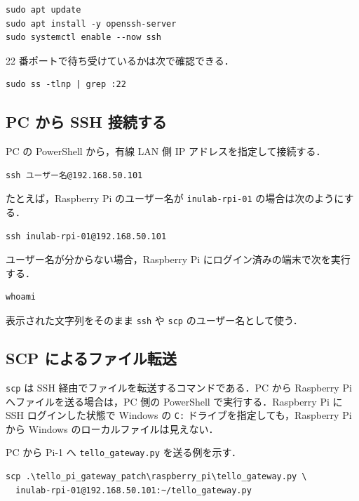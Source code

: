 \begin{lstlisting}
sudo apt update
sudo apt install -y openssh-server
sudo systemctl enable --now ssh
\end{lstlisting}

22 番ポートで待ち受けているかは次で確認できる．

\begin{lstlisting}
sudo ss -tlnp | grep :22
\end{lstlisting}

\subsection{PC から SSH 接続する}

PC の PowerShell から，有線 LAN 側 IP アドレスを指定して接続する．

\begin{lstlisting}
ssh ユーザー名@192.168.50.101
\end{lstlisting}

たとえば，Raspberry Pi のユーザー名が \texttt{inulab-rpi-01} の場合は次のようにする．

\begin{lstlisting}
ssh inulab-rpi-01@192.168.50.101
\end{lstlisting}

ユーザー名が分からない場合，Raspberry Pi にログイン済みの端末で次を実行する．

\begin{lstlisting}
whoami
\end{lstlisting}

表示された文字列をそのまま \texttt{ssh} や \texttt{scp} のユーザー名として使う．

\subsection{SCP によるファイル転送}

\texttt{scp} は SSH 経由でファイルを転送するコマンドである．PC から Raspberry Pi へファイルを送る場合は，PC 側の PowerShell で実行する．Raspberry Pi に SSH ログインした状態で Windows の \texttt{C:} ドライブを指定しても，Raspberry Pi から Windows のローカルファイルは見えない．

PC から Pi-1 へ \texttt{tello\_gateway.py} を送る例を示す．

\begin{lstlisting}
scp .\tello_pi_gateway_patch\raspberry_pi\tello_gateway.py \
  inulab-rpi-01@192.168.50.101:~/tello_gateway.py
\end{lstlisting}

